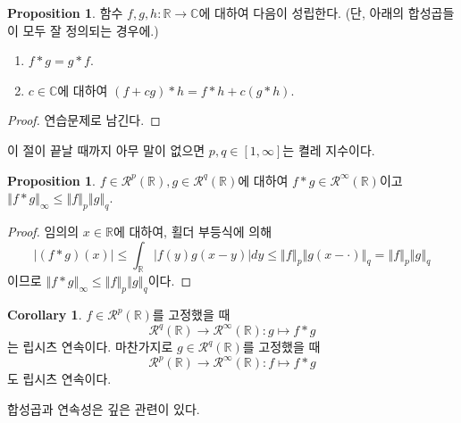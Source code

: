 \documentclass[11pt]{book}
\numberwithin{equation}{chapter}
\def\RR{\mathbb{R}}
\def\CC{\mathbb{C}}
\def\calR{\mathcal{R}}
\newcommand{\abs}[1]{\left\vert#1\right\vert}
\newcommand{\norm}[1]{\left\Vert#1\right\Vert}
\theoremstyle{definition}
\newtheorem{cor}[thm]{Corollary}
\newtheorem{prop}[thm]{Proposition}
\newenvironment{enum}
	{\begin{enumerate}[label=(\alph*), leftmargin=2\parindent]}
	{\end{enumerate}}
\begin{document}
\begin{prop}
    함수 \(f, g, h : \RR \to \CC\)에 대하여 다음이 성립한다. (단, 아래의 합성곱들이 모두 잘 정의되는 경우에.)
    \begin{enum}
        \item \(f * g = g * f\).
        \item \(c \in \CC\)에 대하여 \((f + cg) * h = f * h + c(g * h)\).
    \end{enum}
\end{prop}
\begin{proof}
    연습문제로 남긴다.
\end{proof}

이 절이 끝날 때까지 아무 말이 없으면 \(p, q \in [1, \infty]\)는 켤레 지수이다.

\begin{prop}
    \(f \in \calR^p(\RR), g \in \calR^q(\RR)\)에 대하여 \(f * g \in \calR^\infty(\RR)\)이고 \(\norm{f * g}_\infty \le \norm{f}_p \norm{g}_q\).
\end{prop}
\begin{proof}
    임의의 \(x \in \RR\)에 대하여, 횔더 부등식에 의해
    \[
    \abs{(f * g)(x)} \le \int_\RR \abs{f(y) g(x -y)}dy \le \norm{f}_p \norm{g(x - \cdot)}_q = \norm{f}_p \norm{g}_q
    \]
    이므로 \(\norm{f * g}_\infty \le \norm{f}_p \norm{g}_q\)이다.
\end{proof}

\begin{cor}
    \(f \in \calR^p(\RR)\)를 고정했을 때
    \[
    \calR^q(\RR) \to \calR^\infty(\RR) : g \mapsto f * g    
    \]
    는 립시츠 연속이다. 마찬가지로 \(g \in \calR^q(\RR)\)를 고정했을 때
    \[
    \calR^p(\RR) \to \calR^\infty(\RR) : f \mapsto f * g
    \]
    도 립시츠 연속이다.
\end{cor}

합성곱과 연속성은 깊은 관련이 있다.
\end{document}
